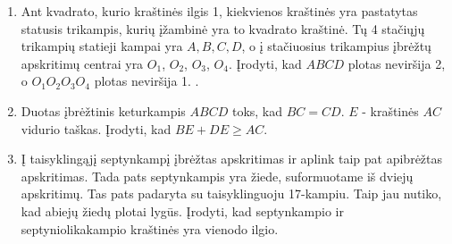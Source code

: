 \begin{enumerate}
\item Ant kvadrato, kurio kraštinės ilgis 1, kiekvienos
  kraštinės yra pastatytas statusis trikampis, kurių
  įžambinė yra to kvadrato kraštinė. Tų 4 stačiųjų trikampių
  statieji kampai yra $A, B, C, D$, o į stačiuosius trikampius
  įbrėžtų apskritimų centrai yra $O_1$, $O_2$, $O_3$, $O_4$.
  Įrodyti, kad $ABCD$ plotas neviršija 2, o $O_1O_2O_3O_4$
  plotas neviršija 1.
.

\item Duotas įbrėžtinis keturkampis $ABCD$ toks, kad
  $BC=CD$. $E$ - kraštinės $AC$ vidurio taškas. Įrodyti, kad
  $BE+DE\geq AC$.
\item Į taisyklingąjį septynkampį įbrėžtas apskritimas ir
  aplink taip pat apibrėžtas apskritimas. Tada pats
  septynkampis yra žiede, suformuotame iš dviejų apskritimų.
  Tas pats padaryta su taisyklinguoju 17-kampiu. Taip jau
  nutiko, kad abiejų žiedų plotai lygūs. Įrodyti, kad
  septynkampio ir septyniolikakampio kraštinės yra vienodo
  ilgio.


\end{enumerate}
